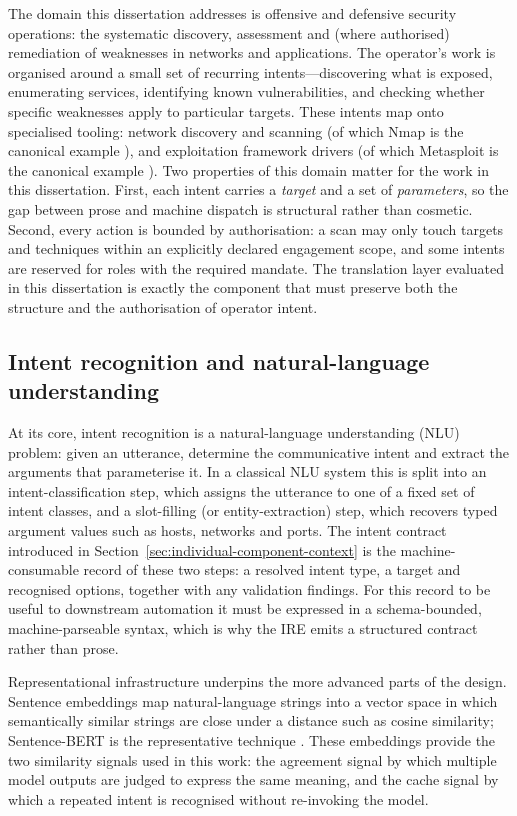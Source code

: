 The domain this dissertation addresses is offensive and defensive security
operations: the systematic discovery, assessment and (where authorised)
remediation of weaknesses in networks and applications. The operator's work is
organised around a small set of recurring intents---discovering what is
exposed, enumerating services, identifying known vulnerabilities, and checking
whether specific weaknesses apply to particular targets. These intents map onto
specialised tooling: network discovery and scanning (of which Nmap is the
canonical example \parencite{lyon2009nmap}), and exploitation framework
drivers (of which Metasploit is the canonical example \parencite{metasploit}).
Two properties of this domain matter for the work in this dissertation. First,
each intent carries a \emph{target} and a set of \emph{parameters}, so the gap
between prose and machine dispatch is structural rather than cosmetic. Second,
every action is bounded by authorisation: a scan may only touch targets and
techniques within an explicitly declared engagement scope, and some intents are
reserved for roles with the required mandate. The translation layer evaluated
in this dissertation is exactly the component that must preserve both the
structure and the authorisation of operator intent.

\subsection*{Intent recognition and natural-language understanding}

At its core, intent recognition is a natural-language understanding (NLU)
problem: given an utterance, determine the communicative intent and extract the
arguments that parameterise it. In a classical NLU system this is split into an
intent-classification step, which assigns the utterance to one of a fixed set
of intent classes, and a slot-filling (or entity-extraction) step, which
recovers typed argument values such as hosts, networks and ports. The intent
contract introduced in Section~\ref{sec:individual-component-context} is the
machine-consumable record of these two steps: a resolved intent type, a target
and recognised options, together with any validation findings. For this record
to be useful to downstream automation it must be expressed in a
schema-bounded, machine-parseable syntax, which is why the IRE emits a
structured contract rather than prose.

Representational infrastructure underpins the more advanced parts of the
design. Sentence embeddings map natural-language strings into a vector space in
which semantically similar strings are close under a distance such as cosine
similarity; Sentence-BERT is the representative technique \parencite{reimers2019sbert}.
These embeddings provide the two similarity signals used in this work: the
agreement signal by which multiple model outputs are judged to express the same
meaning, and the cache signal by which a repeated intent is recognised without
re-invoking the model.

